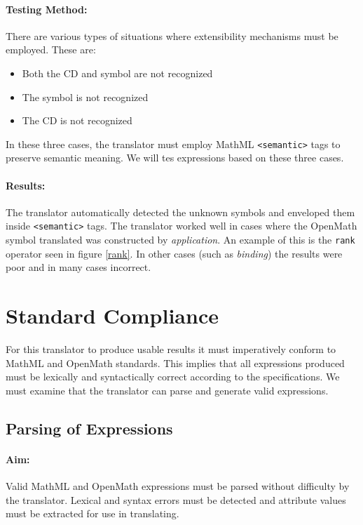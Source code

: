 \paragraph{Testing Method:} There are various types of situations where
extensibility mechanisms must be employed. These are:

\begin{itemize}

\item Both the CD and symbol are not recognized

\item The symbol is not recognized

\item The CD is not recognized

\end{itemize}

In these three cases, the translator must employ MathML \verb|<semantic>|
tags to preserve semantic meaning. We will tes expressions
based on these three cases.

\paragraph{Results:} The translator automatically detected the unknown
symbols and enveloped them inside \verb|<semantic>| tags. The translator
worked well in cases where the OpenMath symbol translated was constructed
by {\it application}.  An example of this is the {\tt rank} operator seen
in figure \ref{rank}. In other cases (such as {\it binding}) the results
were poor and in many cases incorrect.

\section{Standard Compliance}

For this translator to produce usable results it must imperatively conform to MathML and OpenMath standards. This implies that all expressions
produced must be lexically and syntactically correct according to the specifications.  We must examine that the translator can parse and generate
valid expressions.

\subsection{Parsing of Expressions}

\paragraph{Aim:} Valid MathML and OpenMath expressions must be parsed
without difficulty by the translator. Lexical and syntax errors must be
detected and attribute values must be extracted for use in translating.

